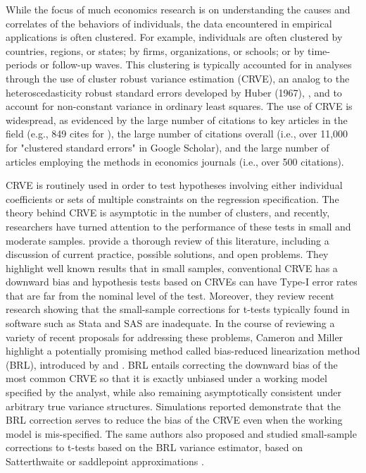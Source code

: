 \documentclass[12pt]{article}
\begin{document}
While the focus of much economics research is on understanding the causes and correlates of the behaviors of individuals, the data encountered in empirical applications is often clustered. 
For example, individuals are often clustered by countries, regions, or states; by firms, organizations, or schools; or by time-periods or follow-up waves. 
This clustering is typically accounted for in analyses through the use of cluster robust variance estimation (CRVE), an analog to the heteroscedasticity robust standard errors developed by Huber (1967), \citet{eicker1967limit}, and \citet{White1980heteroskedasticity} to account for non-constant variance in ordinary least squares. 
The use of CRVE is widespread, as evidenced by the large number of citations to key articles in the field (e.g., 849 cites for \citet{Wooldridge2003cluster}), 
the large number of citations overall (i.e., over 11,000 for "clustered standard errors" in Google Scholar), and the large number of articles employing the methods in economics journals (i.e., over 500 citations). 

CRVE is routinely used in order to test hypotheses involving either individual coefficients or sets of multiple constraints on the regression specification. 
The theory behind CRVE is asymptotic in the number of clusters, and recently, researchers have turned attention to the performance of these tests in small and moderate samples. 
\citet{Cameron2015practitioners} provide a thorough review of this literature, including a discussion of current practice, possible solutions, and open problems. 
They highlight well known results that in small samples, conventional CRVE has a downward bias and hypothesis tests based on CRVEs can have Type-I error rates that are far from the nominal level of the test.
Moreover, they review recent research showing that the small-sample corrections for t-tests typically found in software such as Stata and SAS are inadequate. 
In the course of reviewing a variety of recent proposals for addressing these problems, Cameron and Miller highlight a potentially promising method called bias-reduced linearization method (BRL), introduced by \citet{McCaffrey2001generalizations} and \citet{Bell2002bias}. 
BRL entails correcting the downward bias of the most common CRVE so that it is exactly unbiased under a working model specified by the analyst, while also remaining asymptotically consistent under arbitrary true variance structures. 
Simulations reported \citet{Bell2002bias} demonstrate that the BRL correction serves to reduce the bias of the CRVE even when the working model is mis-specified. 
The same authors also proposed and studied small-sample corrections to t-tests based on the BRL variance estimator, based on Satterthwaite \citet{Bell2002bias} or saddlepoint approximations \citep{McCaffrey2006improved}.
\end{document}
